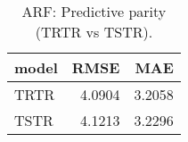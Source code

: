 \begin{table}[ht]
\centering
\begin{tabular}{lrr}
  \hline
model & RMSE & MAE \\ 
  \hline
TRTR & 4.0904 & 3.2058 \\ 
  TSTR & 4.1213 & 3.2296 \\ 
   \hline
\end{tabular}
\caption{ARF: Predictive parity (TRTR vs TSTR).} 
\label{tab:arf:perf}
\end{table}
